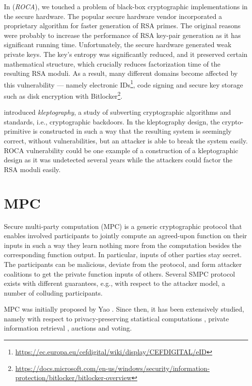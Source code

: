 \documentclass[
  digital, %
  twoside, %
  table,   %
  lof,     %
  lot,     %
]{fithesis3}
\newcounter{ph4_show_guides}
\theoremstyle{definition}
\theoremstyle{remark}
\begin{document}
In \cite{2017-ccs-nemec} (\emph{ROCA}), we touched a problem of black-box cryptographic implementations in the secure hardware. The popular secure hardware vendor incorporated a proprietary algorithm for faster generation of RSA primes. The original reasons were probably to increase the performance of RSA key-pair generation as it has significant running time. Unfortunately, the secure hardware generated weak private keys. The key's entropy was significantly reduced, and it preserved certain mathematical structure, which crucially reduces factorization time of the resulting RSA moduli. 
As a result, many different domains become affected by this vulnerability — namely electronic IDs\footnote{\url{https://ec.europa.eu/cefdigital/wiki/display/CEFDIGITAL/eID}}, code signing and secure key storage such as disk encryption with Bitlocker\footnote{\url{https://docs.microsoft.com/en-us/windows/security/information-protection/bitlocker/bitlocker-overview}}.

\cite{Young:1996:DSB:646761.706030} introduced \emph{kleptography}, a study of subverting cryptographic algorithms and standards, i.e., cryptographic backdoors. In the kleptography design, the crypto-primitive is constructed in such a way that the resulting system is seemingly correct, without vulnerabilities, but an attacker is able to break the system easily. ROCA vulnerability could be one example of a construction of a kleptographic design as it was undetected several years while the attackers could factor the RSA moduli easily.

\section{MPC}
Secure multi-party computation (MPC) is a generic cryptographic protocol that enables involved participants to jointly compute an agreed-upon function on their inputs in such a way they learn nothing more from the computation besides the corresponding function output. In particular, inputs of other parties stay secret. The participants can be malicious, deviate from the protocol, and form attacker coalitions to get the private function inputs of others. Several SMPC protocol exists with different guarantees, e.g., with respect to the attacker model, a number of colluding participants.

MPC was initially proposed by Yao \cite{yao82}. Since then, it has been extensively studied, namely with respect to privacy-preserving statistical computations \cite{BJSV15, BKKRST16}, private information retrieval \cite{Bertino2005, Naor:1999:PPA:336992.337028}, auctions and voting.
\end{document}
